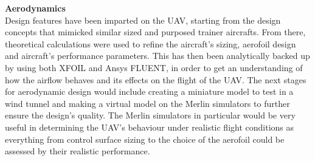 \documentclass[12pt]{article}
\begin{document}
\noindent \textbf{Aerodynamics}\\
\noindent Design features have been imparted on the UAV, starting from the design concepts that mimicked similar sized and purposed trainer aircrafts. From there, theoretical calculations were used to refine the aircraft’s sizing, aerofoil design and aircraft’s performance parameters. This has then been analytically backed up by using both XFOIL and Ansys FLUENT, in order to get an understanding of how the airflow behaves and its effects on the flight of the UAV. The next stages for aerodynamic design would include creating a miniature model to test in a wind tunnel and making a virtual model on the Merlin simulators to further ensure the design’s quality. The Merlin simulators in particular would be very useful in determining the UAV’s behaviour under realistic flight conditions as everything from control surface sizing to the choice of the aerofoil could be assessed by their realistic performance. \\

\newpage
\end{document}
